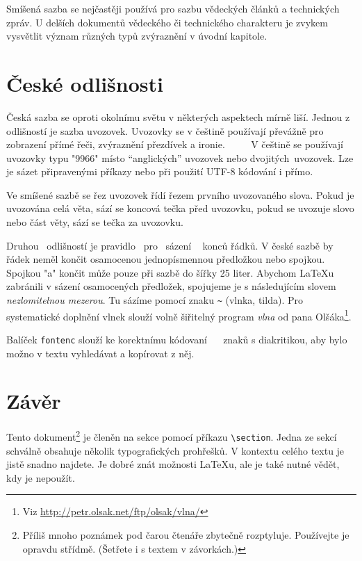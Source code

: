 \documentclass[a4paper, 10pt, twocolumn]{article}
\begin{document}
Smíšená sazba se nejčastěji používá pro sazbu vědeckých článků a technických zpráv. U delších dokumentů vědeckého či technického charakteru je zvykem vysvětlit význam různých typů zvýraznění v úvodní kapitole.


\section{České odlišnosti}

Česká sazba se oproti okolnímu světu v některých aspektech mírně liší. Jednou z odlišností je sazba uvozovek. Uvozovky se v češtině používají převážně pro zobrazení přímé řeči, zvýraznění přezdívek a ironie. ~~~~ V češtině se používají uvozovky typu "9966" místo ``anglických'' uvozovek nebo
\textquotedbl dvojitých\textquotedbl ~uvozovek. Lze je sázet připravenými příkazy nebo při použití UTF-8 kódování i přímo.

Ve smíšené sazbě se řez uvozovek řídí řezem prvního uvozovaného slova. Pokud je uvozována celá věta, sází se koncová tečka před uvozovku, pokud se uvozuje slovo nebo část věty, sází se tečka za uvozovku.

Druhou ~odlišností je pravidlo ~pro ~sázení ~ konců řád\-ků. V české sazbě by řádek neměl končit osamocenou jednopísmennou předložkou nebo spojkou. Spojkou "a" končit může pouze při sazbě do šířky 25 liter. Abychom \LaTeX u zabránili v sázení osamocených předložek, spojujeme je s následujícím slovem \emph{nezlomitelnou mezerou}. Tu sázíme pomocí znaku \verb!~! (vlnka, tilda). Pro systematické doplnění vlnek slouží volně šiřitelný program \emph{vlna} od pana Olšáka\footnote{Viz \url{http://petr.olsak.net/ftp/olsak/vlna/}}.

Balíček \texttt{fontenc} slouží ke korektnímu kódovaní ~~ zna\-ků s diakritikou, aby bylo možno v textu vyhledávat a kopírovat z něj.

\section{Závěr}

Tento dokument\footnote{Příliš mnoho poznámek pod čarou čtenáře zbytečně rozptyluje. Používejte je opravdu střídmě. (Šetřete i s textem v závorkách.)} je členěn na sekce pomocí příkazu \verb!\section!. Jedna ze sekcí schválně obsahuje několik typografických prohřešků. V kontextu celého textu je jistě snadno najdete. Je dobré znát možnosti \LaTeX u, ale je také nutné vědět, kdy je nepoužít.
\end{document}
